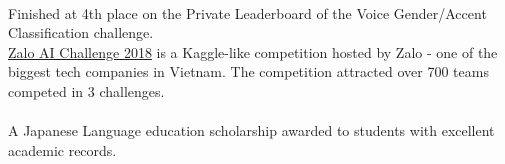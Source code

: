 \\
Finished at 4th place on the Private Leaderboard of the Voice Gender/Accent Classification challenge.\\
\indent \href{https://challenge.zalo.ai}{Zalo AI Challenge 2018} is a Kaggle-like competition hosted by Zalo - one of the biggest tech companies in Vietnam. The competition attracted over 700 teams competed in 3 challenges.\\

\\
A Japanese Language education scholarship awarded to students with excellent academic records.\\